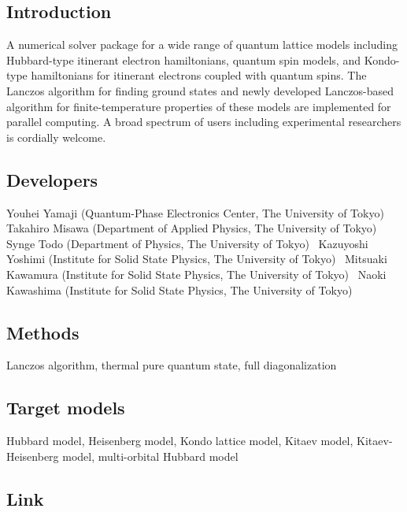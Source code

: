 \subsection*{Introduction}

A numerical solver package for a wide range of quantum lattice models including Hubbard-\/type itinerant electron hamiltonians, quantum spin models, and Kondo-\/type hamiltonians for itinerant electrons coupled with quantum spins. The Lanczos algorithm for finding ground states and newly developed Lanczos-\/based algorithm for finite-\/temperature properties of these models are implemented for parallel computing. A broad spectrum of users including experimental researchers is cordially welcome. 

 \subsection*{Developers}

Youhei Yamaji (Quantum-\/\+Phase Electronics Center, The University of Tokyo)~\newline
Takahiro Misawa (Department of Applied Physics, The University of Tokyo)~\newline
Synge Todo (Department of Physics, The University of Tokyo)~\newline
Kazuyoshi Yoshimi (Institute for Solid State Physics, The University of Tokyo)~\newline
Mitsuaki Kawamura (Institute for Solid State Physics, The University of Tokyo)~\newline
Naoki Kawashima (Institute for Solid State Physics, The University of Tokyo) 

 \subsection*{Methods}

Lanczos algorithm, thermal pure quantum state, full diagonalization 

 \subsection*{Target models}

Hubbard model, Heisenberg model, Kondo lattice model, Kitaev model, Kitaev-\/\+Heisenberg model, multi-\/orbital Hubbard model 

 \subsection*{Link}

